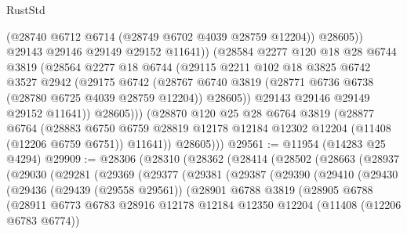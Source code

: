 \begin{lexlean}{RustStd}
\begin{coremodule}
                    (@28740 @6712 @6714 (@28749 @6702 @4039 @28759 @12204))
                    @28605))
                @29143
                @29146
                @29149
                @29152
                @11641))
            (@28584
              @2277
              @120
              @18
              @28
              @6744
              @3819
              (@28564
                @2277
                @18
                @6744
                (@29115
                  @2211
                  @102
                  @18
                  @3825
                  @6742
                  @3527
                  @2942
                  (@29175
                    @6742
                    (@28767
                      @6740
                      @3819
                      (@28771 @6736 @6738 (@28780 @6725 @4039 @28759 @12204))
                      @28605))
                  @29143
                  @29146
                  @29149
                  @29152
                  @11641))
              @28605)))
        (@28870
          @120
          @25
          @28
          @6764
          @3819
          (@28877
            @6764
            (@28883
              @6750
              @6759
              @28819
              @12178
              @12184
              @12302
              @12204
              (@11408 (@12206 @6759 @6751))
              @11641))
          @28605)))
@29561 := @11954 (@14283 @25 @4294)
@29909 := @28306
    (@28310
      (@28362
        (@28414
          (@28502
            (@28663
              (@28937
                (@29030
                  (@29281
                    (@29369
                      (@29377
                        (@29381
                          (@29387
                            (@29390
                              (@29410
                                (@29430
                                  (@29436
                                    (@29439 (@29558 @29561))
                                    (@28901
                                      @6788
                                      @3819
                                      (@28905
                                        @6788
                                        (@28911
                                          @6773
                                          @6783
                                          @28916
                                          @12178
                                          @12184
                                          @12350
                                          @12204
                                          (@11408 (@12206 @6783 @6774))

\end{coremodule}
\end{lexlean}
